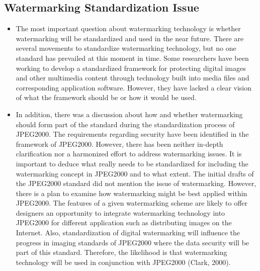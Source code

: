 \documentclass[12pt]{IEEEtran}
\begin{document}
\begin{enumerate}
\section{Watermarking Standardization Issue}
\begin{itemize}
\item The most important question about watermarking technology is whether watermarking will be standardized and used in the near future. There are several movements to standardize watermarking technology, but no one standard has prevailed at this moment in time. Some researchers have been working to develop a standardized framework for protecting digital images and other multimedia content through technology built into media files and corresponding application software. However, they have lacked a clear vision of what the framework should be or how it would be used.\\

\item In addition, there was a discussion about how and whether watermarking should form part of the standard during the standardization process of JPEG2000. The requirements regarding security have been identified in the framework of JPEG2000. However, there has been neither in-depth clarification nor a harmonized effort to address watermarking issues. It is important to deduce what really needs to be standardized for including the watermarking concept in JPEG2000 and to what extent. The initial drafts of the JPEG2000 standard did not mention the issue of watermarking. However, there is a plan to examine how watermarking might be best applied within JPEG2000. The features of a given watermarking scheme are likely to offer designers an opportunity to integrate watermarking technology into JPEG2000 for different application such as distributing images on the Internet. Also, standardization of digital watermarking will influence the progress in imaging standards of JPEG2000 where the data security will be part of this standard. Therefore, the likelihood is that watermarking technology will be used in conjunction with JPEG2000 (Clark, 2000).
\end{itemize}

\end{enumerate}
\end{document}
